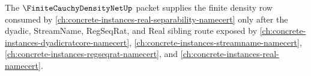 The $\FiniteCauchyDensityNetUp$ packet supplies the finite density row consumed by \autoref{ch:concrete-instances-real-separability-namecert} only after the dyadic, StreamName, RegSeqRat, and Real sibling route exposed by \autoref{ch:concrete-instances-dyadicratcore-namecert}, \autoref{ch:concrete-instances-streamname-namecert}, \autoref{ch:concrete-instances-regseqrat-namecert}, and \autoref{ch:concrete-instances-real-namecert}.
